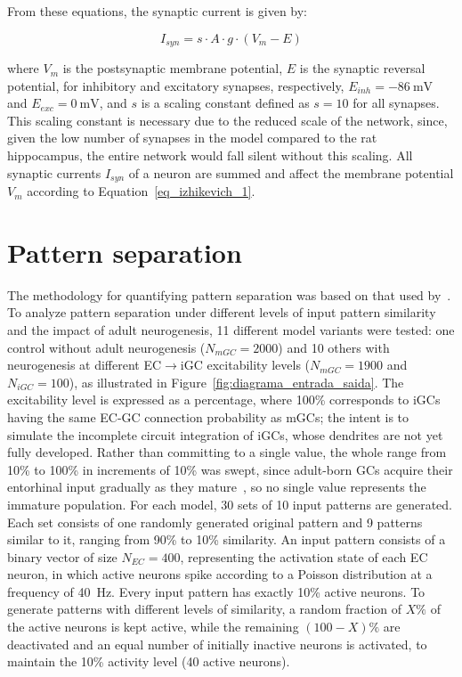 From these equations, the synaptic current is given by:

\begin{equation}
    \label{eq_tsodyks_I}
    I_{syn} = s \cdot A \cdot g \cdot (V_m - E)
\end{equation}

where $V_m$ is the postsynaptic membrane potential, $E$ is the synaptic reversal potential, for inhibitory and excitatory
synapses, respectively, $E_{inh} = \SI{-86}{\milli\volt}$ and $E_{exc} = \SI{0}{\milli\volt}$, and $s$ is a scaling constant
defined as $s = 10$ for all synapses. This scaling constant is necessary due to the reduced scale of the network, since, given
the low number of synapses in the model compared to the rat hippocampus, the entire network would fall silent without this
scaling. All synaptic currents $I_{syn}$ of a neuron are summed and affect the membrane potential $V_m$ according to
Equation~\ref{eq_izhikevich_1}.



\section{Pattern separation}\label{sec:separacao_padroes}

The methodology for quantifying pattern separation was based on that used by~\textcite{kimEffect2024}. To analyze pattern
separation under different levels of input pattern similarity and the impact of adult neurogenesis, 11 different model variants
were tested: one control without adult neurogenesis ($N_{mGC} = 2000$) and 10 others with neurogenesis at different
EC$\to$iGC excitability levels ($N_{mGC} = 1900$ and $N_{iGC} = 100$), as illustrated in
Figure~\ref{fig:diagrama_entrada_saida}. The
excitability level is expressed as a percentage, where 100\% corresponds to iGCs having the same EC-GC connection probability
as mGCs; the intent is to simulate the incomplete circuit integration of iGCs, whose dendrites are not yet fully developed.
Rather than committing to a single value, the whole range from 10\% to 100\% in increments of 10\% was swept, since adult-born
GCs acquire their entorhinal input gradually as they mature~\parencite{espositoNeuronal2005, aimoneRegulation2014}, so no single
value represents the immature population. For
each model, 30 sets of 10 input patterns are generated. Each set consists of one randomly generated original pattern and 9
patterns similar to it, ranging from 90\% to 10\% similarity. An input pattern consists of a binary vector of size
$N_{EC} = 400$, representing the activation state of each EC neuron, in which active neurons spike according to a Poisson
distribution at a frequency of \SI{40}{\hertz}. Every input pattern has exactly 10\% active neurons. To generate patterns with
different levels of similarity, a random fraction of $X\%$ of the active neurons is kept active, while the remaining
$(100 - X)\%$ are deactivated and an equal number of initially inactive neurons is activated, to maintain the 10\% activity
level (40 active neurons).

